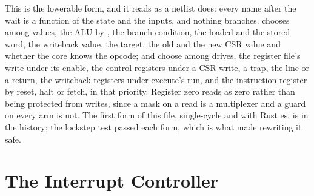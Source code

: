 \documentclass[journal,onecolumn,9pt]{IEEEtran}
\begin{document}
This is the lowerable form, and it reads as a netlist does: every
name after the wait is a function of the state and the inputs, and
nothing branches.  chooses among values, the ALU by
, the branch condition, the loaded and the stored word, the
writeback value, the target, the old and the new CSR value and
whether the core knows the opcode;  and 
choose among drives, the register file's write under its enable,
the control registers under a CSR write, a
trap, the line or a return, the writeback registers under execute's run, and
the instruction register by reset, halt or fetch, in that priority.
Register zero reads as zero rather than being protected from writes, since a mask
on a read is a multiplexer and a guard on every arm is not. The
first form of this file, single-cycle and with Rust es,
is in the history; the lockstep test passed each form, which is what
made rewriting it safe.



\section{The Interrupt Controller}
\label{sec:v-plic}
\end{document}

